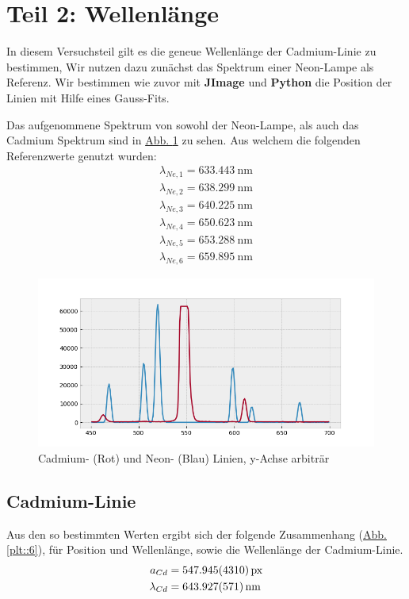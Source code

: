 \section{Teil 2: Wellenlänge}
  In diesem Versuchsteil gilt es die geneue Wellenlänge der Cadmium-Linie zu bestimmen, Wir nutzen dazu zunächst das Spektrum einer Neon-Lampe als Referenz.
  Wir bestimmen wie zuvor mit \textbf{JImage} und \textbf{Python} die Position der Linien mit Hilfe eines Gauss-Fits.

  Das aufgenommene Spektrum von sowohl der Neon-Lampe, als auch das Cadmium Spektrum sind in \hyperref[plt::5]{Abb. \ref*{plt::5}} zu sehen. Aus welchem die folgenden Referenzwerte genutzt wurden:
  \begin{align}
    \lambda_{Ne,1} = \SI{633.443}{\nano\metre}\nonumber\\
    \lambda_{Ne,2} = \SI{638.299}{\nano\metre}\nonumber\\
    \lambda_{Ne,3} = \SI{640.225}{\nano\metre}\nonumber\\
    \lambda_{Ne,4} = \SI{650.623}{\nano\metre}\nonumber\\
    \lambda_{Ne,5} = \SI{653.288}{\nano\metre}\nonumber\\
    \lambda_{Ne,6} = \SI{659.895}{\nano\metre}
  \end{align}


  \begin{figure}[H]
    \centering
    \includegraphics[width=\textwidth]{Auswertung/wavelength_analysis/wl}
    \caption{Cadmium- (Rot) und Neon- (Blau) Linien, y-Achse arbiträr}
    \label{plt::5}
  \end{figure}

  \subsection{Cadmium-Linie}
    Aus den so bestimmten Werten ergibt sich der folgende Zusammenhang (\hyperref[plt::6]{Abb. \ref*{plt::6}}), für Position und Wellenlänge, sowie die Wellenlänge der Cadmium-Linie.
    \begin{align}
      a_{Cd}       &= \SI{547.945+-4.310}{px}\\
      \lambda_{Cd} &= \SI{643.927+-0.571}{\nano\metre}
    \end{align}

